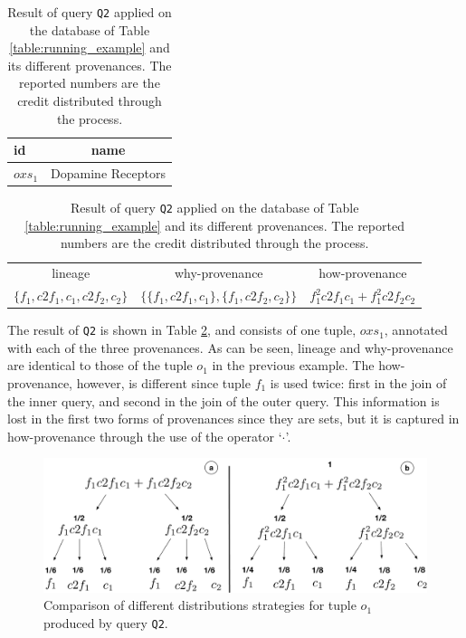 \begin{table}[]
\centering
  \begin{tabular}{|l||c|}
  \hline
    id & name\\
    \hline
    $oxs_1$ &  Dopamine Receptors\\
    \hline
  \end{tabular}
  \newline
\vspace{2mm}
  \begin{tabular}{c | c | c}
  	lineage & why-provenance & how-provenance   \\
  	$\{f_1, c2f_1, c_1, c2f_2, c_2\}$ & $\{\{f_1, c2f_1, c_1\}, \{f_1, c2f_2, c_2\}\}$ & $f_1^2 c2f_1 c_1 + f_1^2 c2f_2 c_2$\\
  \end{tabular}
    \caption{Result of query \texttt{Q2} applied on the database of Table \ref{table:running_example} and its different provenances. The reported numbers are the credit distributed through the process.}
  \label{table:difference_result}
\end{table}

The result of \texttt{Q2} is shown in Table \ref{table:difference_result}, and consists of one tuple, $oxs_1$, annotated with each of the three provenances. As can be seen, lineage and why-provenance are identical to those of the tuple $o_1$ in the previous example. 
The how-provenance, however, is different since tuple $f_1$ is used twice: first in the join of the inner query, and second in the join of the outer query. This information is lost in the first two forms of provenances since they are sets, but it is captured in how-provenance through the use of the operator `$\cdot$'.


\begin{figure}[]
  \includegraphics[width=\textwidth]{figures/new_comparison.pdf}
  \caption{Comparison of different distributions strategies for tuple $o_1$ produced by query \texttt{Q2}.}
  \label{figure:distributions_differences}
\end{figure}


